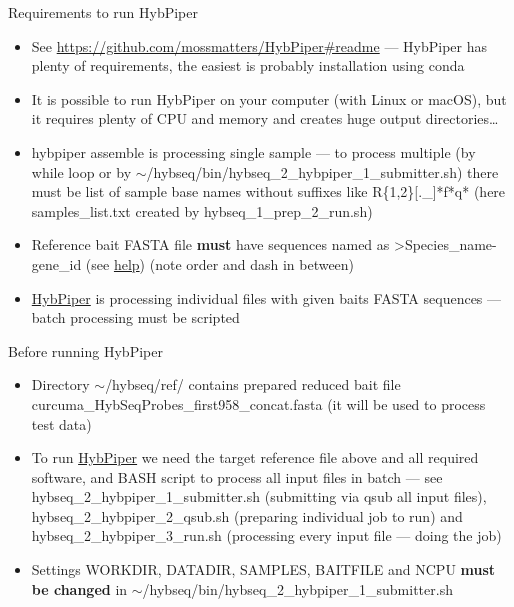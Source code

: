 \documentclass[compress,  xelatex, 11pt, xcolor=x11names, aspectratio=169,
	hyperref={
		bookmarks=true,
		unicode=true,
		colorlinks=true,
		pdftitle={HybSeq course},
		plainpages=false,
		pdfauthor={Vojtech Zeisek},
		pdfsubject={Practical processing of HybSeq target enrichment sequencing data on computing grids like MetaCentrum},
		pdfcreator={XeLaTeX},
		pdfkeywords={BASH, command line, GNU, HybSeq, Linux, MetaCentrum, sequencing shell, target enrichment},
		linkcolor=Turquoise4, %
		anchorcolor=DodgerBlue4, %
		citecolor=DodgerBlue4, %
		filecolor=DodgerBlue4, %
		menucolor=Tan4, %
		urlcolor=DarkOliveGreen4 %
		},
	url={hyphens, lowtilde} %
	]{beamer}
\renewcommand{\texttt}[1]{\colorbox{Cornsilk2}{{\ttfamily #1}}}
\renewcommand{\alert}[1]{\textcolor{OrangeRed3}{#1}}
\begin{document}
\begin{frame}{Requirements to run HybPiper}
	\begin{itemize}
		\item See \url{https://github.com/mossmatters/HybPiper\#readme} --- HybPiper has plenty of requirements, the easiest is probably installation using \texttt{conda}
		\item It is possible to run HybPiper on your computer (with Linux or macOS), but it requires plenty of CPU and memory and creates huge output directories\ldots
		\item \texttt{hybpiper assemble} is processing single sample --- to process multiple (by \texttt{while} loop or by \texttt{$\sim$/hybseq/bin/hybseq\_2\_hybpiper\_1\_submitter.sh}) there must be list of sample base names without suffixes like \texttt{*[.\_]R\{1,2\}[.\_]*f*q*} (here \texttt{samples\_list.txt} created by \texttt{hybseq\_1\_prep\_2\_run.sh})
		\item Reference bait FASTA file \textbf{must} have sequences named as \texttt{>Species\_name\alert{-}gene\_id} (see \href{https://github.com/mossmatters/HybPiper/wiki\#12-target-file}{help}) (\alert{note} order and dash in between)
		\item \href{https://github.com/mossmatters/HybPiper}{HybPiper} is processing individual files with given baits FASTA sequences --- batch processing must be scripted
	\end{itemize}
\end{frame}

\begin{frame}{Before running HybPiper}
	\begin{itemize}
		\item Directory \texttt{$\sim$/hybseq/ref/} contains prepared reduced bait file \texttt{curcuma\_HybSeqProbes\_first958\_concat.fasta} (it will be used to process test data)
		\item To run \href{https://github.com/mossmatters/HybPiper}{HybPiper} we need the target reference file above and all required software, and BASH script to process all input files in batch --- see \texttt{hybseq\_2\_hybpiper\_1\_submitter.sh} (submitting via \texttt{qsub} all input files), \texttt{hybseq\_2\_hybpiper\_2\_qsub.sh} (preparing individual job to run) and \texttt{hybseq\_2\_hybpiper\_3\_run.sh} (processing every input file --- doing the job)
		\item \alert{Settings} \texttt{WORKDIR}, \texttt{DATADIR}, \texttt{SAMPLES}, \texttt{BAITFILE} and \texttt{NCPU} \textbf{must be changed} in \texttt{$\sim$/hybseq/bin/hybseq\_2\_hybpiper\_1\_submitter.sh}
	\end{itemize}
\end{frame}
\end{document}
